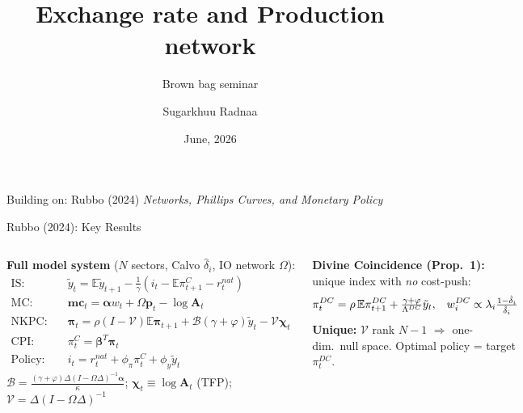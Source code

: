 \documentclass[aspectratio=169, 10pt]{beamer}
\title{\textbf{Exchange rate and Production network}}
\subtitle{Brown bag seminar}
\author{Sugarkhuu Radnaa}
\institute[]{Bonn Graduate School of Economics}
\date{June, 2026}
\newcommand{\bpi}{\bm{\pi}}
\newcommand{\ty}{\tilde{y}}
\begin{document}
\begin{frame}
  \titlepage
  \begin{center}
    \small Building on: Rubbo (2024) \emph{Networks, Phillips Curves, and Monetary Policy}
  \end{center}
\end{frame}

\begin{frame}{Rubbo (2024): Key Results}

\begin{columns}[t]

{\footnotesize \textbf{Full model system} ($N$ sectors, Calvo $\hat\delta_i$, IO network $\Omega$):}
\vspace{-3pt}
{\scriptsize\begin{align*}
\text{IS:} &\quad \ty_t = \mathbb{E}\ty_{t+1} - \tfrac{1}{\gamma}(i_t - \mathbb{E}\pi^C_{t+1} - r^{nat}_t) \\[1pt]
\text{MC:} &\quad \bm{mc}_t = \bm{\alpha}w_t + \Omega\bm{p}_t - \log\mathbf{A}_t \\[1pt]
\text{NKPC:} &\quad \bpi_t = \rho(I{-}\mathcal{V})\mathbb{E}\bpi_{t+1} + \mathcal{B}(\gamma{+}\varphi)\ty_t - \mathcal{V}\bm{\chi}_t \\[1pt]
\text{CPI:} &\quad \pi^C_t = \bm{\beta}^T\bpi_t \\[1pt]
\text{Policy:} &\quad i_t = r^{nat}_t + \phi_\pi\pi^C_t + \phi_y\ty_t
\end{align*}}
\vspace{-5pt}
{\scriptsize $\mathcal{B}{=}\tfrac{(\gamma+\varphi)\Delta(I-\Omega\Delta)^{-1}\bm{\alpha}}{\kappa}$;\; $\bm{\chi}_t \equiv \log\mathbf{A}_t$ (TFP);\; $\mathcal{V}{=}\Delta(I{-}\Omega\Delta)^{-1}$}

\vspace{3pt}
{\footnotesize \textbf{Divine Coincidence (Prop.\ 1):} unique index with \emph{no} cost-push:}
\vspace{-4pt}
\[\footnotesize \pi^{DC}_t = \rho\,\mathbb{E}\pi^{DC}_{t+1} + \tfrac{\gamma+\varphi}{\Lambda^{DC}}\ty_t,\quad w^{DC}_i \propto \lambda_i\tfrac{1-\hat\delta_i}{\hat\delta_i}\]
\vspace{-6pt}
{\footnotesize \textbf{Unique:} $\mathcal{V}$ rank $N{-}1$ $\Rightarrow$ one-dim.\ null space. Optimal policy = target $\pi^{DC}_t$.}


\end{columns}
\end{frame}
\end{document}
